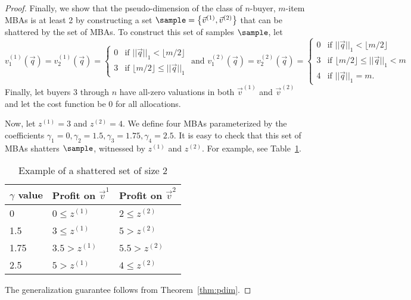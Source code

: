 \begin{proof}
Finally, we show that the pseudo-dimension of the class of $n$-buyer, $m$-item MBAs is at least 2 by constructing a set $\sample = \left\{\vec{v}^{(1)}, \vec{v}^{(2)}\right\}$ that can be shattered by the set of MBAs. To construct this set of samples $\sample$, let \[v_1^{(1)}\left(\vec{q}\right) = v_2^{(1)}\left(\vec{q}\right) = \begin{cases} 0 &\text{if } ||\vec{q}||_1 < \lfloor m/2 \rfloor\\
3 &\text{if } \lfloor m/2 \rfloor \leq ||\vec{q}||_1 \end{cases} \text{ and } v_1^{(2)}\left(\vec{q}\right) = v_2^{(2)}\left(\vec{q}\right) = \begin{cases} 0 &\text{if } ||\vec{q}||_1 < \lfloor m/2 \rfloor\\
3 &\text{if } \lfloor m/2 \rfloor \leq ||\vec{q}||_1 < m\\
4 &\text{if } ||\vec{q}||_1 = m. \end{cases}\] Finally, let buyers 3 through $n$ have all-zero valuations in both $\vec{v}^{(1)}$ and $\vec{v}^{(2)}$ and let the cost function be 0 for all allocations.

Now, let $z^{(1)} = 3$ and $z^{(2)} = 4$. We define four MBAs parameterized by the coefficients $\gamma_1 = 0, \gamma_2 = 1.5, \gamma_3 = 1.75, \gamma_4  = 2.5.$ It is easy to check that this set of MBAs shatters $\sample$, witnessed by $z^{(1)}$ and $z^{(2)}$. For example, see Table~\ref{tab:shattering}.
\begin{table}\centering
{\begin{tabular}{lll}
\textbf{$\gamma$ value} & \textbf{Profit on $\vec{v}^1$} & \textbf{Profit on $\vec{v}^2$} \\\hline
0                 & $0\leq z^{(1)}$                               & $2 \leq z^{(2)}$                               \\
1.5                & $3 \leq z^{(1)}$                               & $5 > z^{(2)}$                            \\
1.75                  & $3.5 > z^{(1)}$                               & $5.5 > z^{(2)}$
\\
2.5                & $5 > z^{(1)}$                               & $4 \leq z^{(2)}$                               \\
\end{tabular}}
\caption{Example of a shattered set of size 2\label{tab:shattering}}
\end{table}

The generalization guarantee follows from Theorem~\ref{thm:pdim}.
\end{proof}


